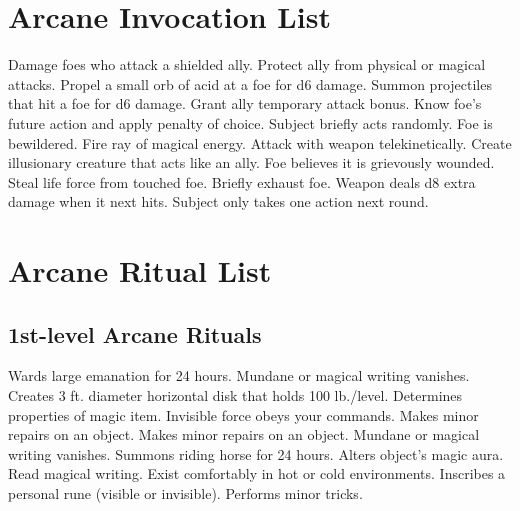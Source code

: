 \section{Arcane Invocation List}
\begin{swspelllist}
   Damage foes who attack a shielded ally.
   Protect ally from physical or magical attacks.
   Propel a small orb of acid at a foe for d6 damage.
   Summon projectiles that hit a foe for d6 damage.
   Grant ally temporary attack bonus.
   Know foe's future action and apply penalty of choice.
   Subject briefly acts randomly.
   Foe is bewildered.
   Fire ray of magical energy.
   Attack with weapon telekinetically.
   Create illusionary creature that acts like an ally.
   Foe believes it is grievously wounded.
   Steal life force from touched foe.
   Briefly exhaust foe.
   Weapon deals d8 extra damage when it next hits.
   Subject only takes one action next round.
\end{swspelllist}

\section{Arcane Ritual List}
\subsection{1st-level Arcane Rituals}
\begin{rituallist}
   Wards large emanation for 24 hours.
   Mundane or magical writing vanishes.
   Creates 3 ft. diameter horizontal disk that holds 100 lb./level.
   Determines properties of magic item.
   Invisible force obeys your commands.
   Makes minor repairs on an object.
   Makes minor repairs on an object.
   Mundane or magical writing vanishes.
   Summons riding horse for 24 hours.
   Alters object's magic aura.
   Read magical writing.
   Exist comfortably in hot or cold environments.
   Inscribes a personal rune (visible or invisible).
   Performs minor tricks.
\end{rituallist}

